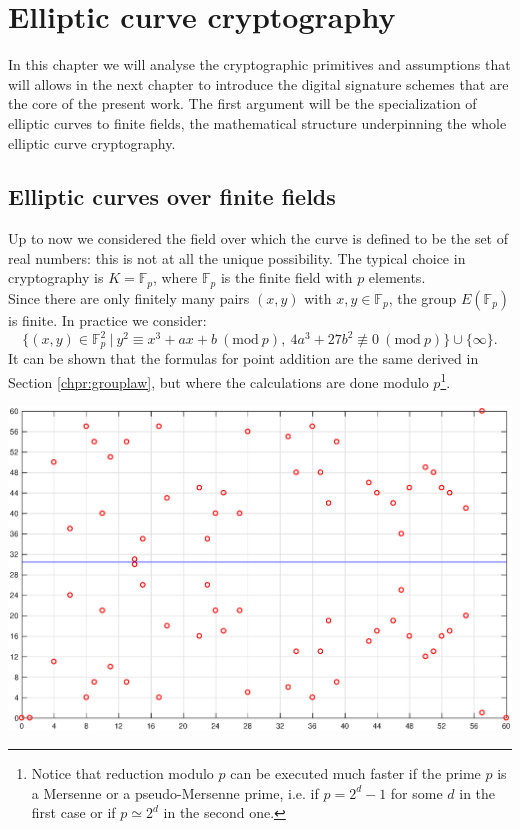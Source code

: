 \chapter{Elliptic curve cryptography}
\label{chpr:ecc}
In this chapter we will analyse the cryptographic primitives and assumptions that will allows in the next chapter to introduce the digital signature schemes that are the core of the present work. The first argument will be the specialization of elliptic curves to finite fields, the mathematical structure underpinning the whole elliptic curve cryptography.

\bigskip

\section{Elliptic curves over finite fields}
Up to now we considered the field over which the curve is defined to be the set of real numbers: this is not at all the unique possibility. The typical choice in cryptography is $K = \mathbb{F}_p$, where $\mathbb{F}_p$ is the finite field with $p$ elements. 
\\
Since there are only finitely many pairs $(x, y)$ with $x, y \in \mathbb{F}_p$, the group $E(\mathbb{F}_p)$ is finite.
In practice we consider: 
$$\{(x, y) \in \mathbb{F}_p^2 \ | \ y^2 \equiv x^3 + ax + b \ (\text{mod} \ p), \ 4a^3 + 27b^2 \not\equiv 0 \ (\text{mod} \ p)\} \cup \{\infty\}.$$
It can be shown that the formulas for point addition are the same derived in Section \ref{chpr:grouplaw}, but where the calculations are done modulo $p$\footnote{Notice that reduction modulo $p$ can be executed much faster if the prime $p$ is a Mersenne or a pseudo-Mersenne prime, i.e. if $p = 2^d - 1$ for some $d$ in the first case or if $p \simeq 2^d$ in the second one.}.
\\
\begin{center}
	\includegraphics[width=0.9\linewidth]{Images/ec_over_ff.eps}
	\label{fig:figure4}
\end{center}

